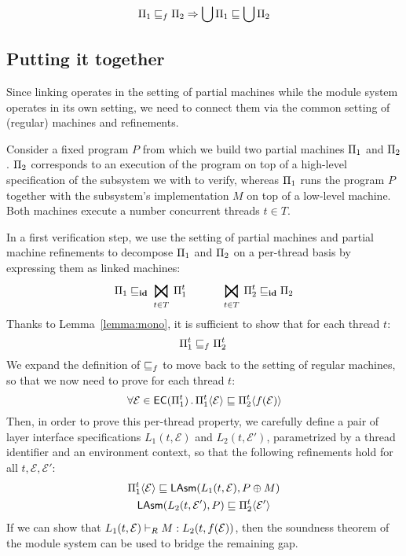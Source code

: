 \begin{lemma}
\[ \Pi_1 \sqsubseteq_f \Pi_2 \Rightarrow \bigcup \Pi_1 \sqsubseteq \bigcup \Pi_2 \]
\end{lemma}

\subsection{Putting it together}

Since linking operates in the setting of partial machines
while the module system operates in its own setting,
we need to connect them
via the common setting of (regular) machines and refinements.

Consider a fixed program $P$
from which we build two partial machines $\Pi_1$ and $\Pi_2$.
$\Pi_2$ corresponds to an execution of the program
on top of a high-level specification of the subsystem
we with to verify,
whereas $\Pi_1$ runs the program $P$ together with the subsystem's implementation $M$
on top of a low-level machine.
Both machines execute a number concurrent threads $t \in T$.

In a first verification step,
we use the setting of partial machines and partial machine refinements to 
decompose $\Pi_1$ and $\Pi_2$ on a per-thread basis
by expressing them as linked machines:
\[
	\Mach_1 \refines_\id \bigJoin_{t \in T} \Mach_1^t  \hspace{3em}
	\bigJoin_{t \in T} \Mach_2^t \refines_\id \Mach_2
\]
Thanks to Lemma~\ref{lemma:mono},
it is sufficient to show that for each thread $t$:
\[
		\Pi_1^t \sqsubseteq_f \Pi_2^t \,
\]
We expand the definition of $\sqsubseteq_f$
to move back to the setting of regular machines,
so that we now need to prove for each thread $t$:
\[
	\forall \mathcal{E} \in {{\mathsf{EC}}({\Pi_1^t})}\,.\,
		\Pi_1^t \langle \mathcal{E} \rangle \sqsubseteq
		\Pi_2^t \langle f(\mathcal{E}) \rangle
\]
Then, in order to prove this per-thread property,
we carefully define a pair of layer interface specifications
$L_1(t, \mathcal{E})$ and $L_2(t, \mathcal{E}')$,
parametrized by a thread identifier and an environment context,
so that the following refinements hold for all $t, \mathcal{E}, \mathcal{E}'$:
\begin{gather*}
	\Pi_1^t \langle \mathcal{E} \rangle \sqsubseteq {\mathsf{LAsm}}(L_1(t, \mathcal{E}), P \oplus M) \\
	{\mathsf{LAsm}}(L_2(t, \mathcal{E}'), P) \sqsubseteq \Pi_2^t \langle \mathcal{E}' \rangle
\end{gather*}
If we can show that
$ L_1(t, \mathcal{E}) \vdash_{R} M : L_2(t, f(\mathcal{E})) $,
then the soundness theorem of the module system
can be used to bridge the remaining gap.


